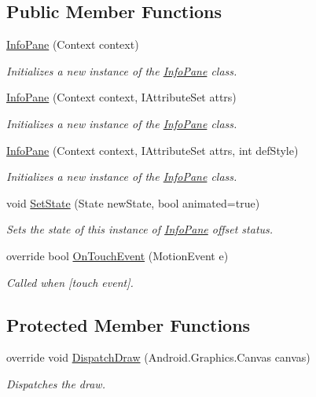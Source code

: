 \subsection*{Public Member Functions}
\begin{DoxyCompactItemize}
\item 
\hyperlink{class_w_c_c_mobile_1_1_info_pane_ae925e23fa98234101c549cc9a038503d}{Info\+Pane} (Context context)
\begin{DoxyCompactList}\small\item\em Initializes a new instance of the \hyperlink{class_w_c_c_mobile_1_1_info_pane}{Info\+Pane} class. \end{DoxyCompactList}\item 
\hyperlink{class_w_c_c_mobile_1_1_info_pane_a36d1b1d35905f3ae02cf64f791c54349}{Info\+Pane} (Context context, I\+Attribute\+Set attrs)
\begin{DoxyCompactList}\small\item\em Initializes a new instance of the \hyperlink{class_w_c_c_mobile_1_1_info_pane}{Info\+Pane} class. \end{DoxyCompactList}\item 
\hyperlink{class_w_c_c_mobile_1_1_info_pane_af14668954e11cc545a5d63aa6787e73c}{Info\+Pane} (Context context, I\+Attribute\+Set attrs, int def\+Style)
\begin{DoxyCompactList}\small\item\em Initializes a new instance of the \hyperlink{class_w_c_c_mobile_1_1_info_pane}{Info\+Pane} class. \end{DoxyCompactList}\item 
void \hyperlink{class_w_c_c_mobile_1_1_info_pane_a236327622ae5c4d3b3725a0d3ebd880a}{Set\+State} (State new\+State, bool animated=true)
\begin{DoxyCompactList}\small\item\em Sets the state of this instance of \hyperlink{class_w_c_c_mobile_1_1_info_pane}{Info\+Pane} offset status. \end{DoxyCompactList}\item 
override bool \hyperlink{class_w_c_c_mobile_1_1_info_pane_a30c1c1fb3ecea8f9a2c2f8b7c7c0cadf}{On\+Touch\+Event} (Motion\+Event e)
\begin{DoxyCompactList}\small\item\em Called when \mbox{[}touch event\mbox{]}. \end{DoxyCompactList}\end{DoxyCompactItemize}
\subsection*{Protected Member Functions}
\begin{DoxyCompactItemize}
\item 
override void \hyperlink{class_w_c_c_mobile_1_1_info_pane_a618d2d1015417dfef2664c42b0c37ff1}{Dispatch\+Draw} (Android.\+Graphics.\+Canvas canvas)
\begin{DoxyCompactList}\small\item\em Dispatches the draw. \end{DoxyCompactList}\end{DoxyCompactItemize}
